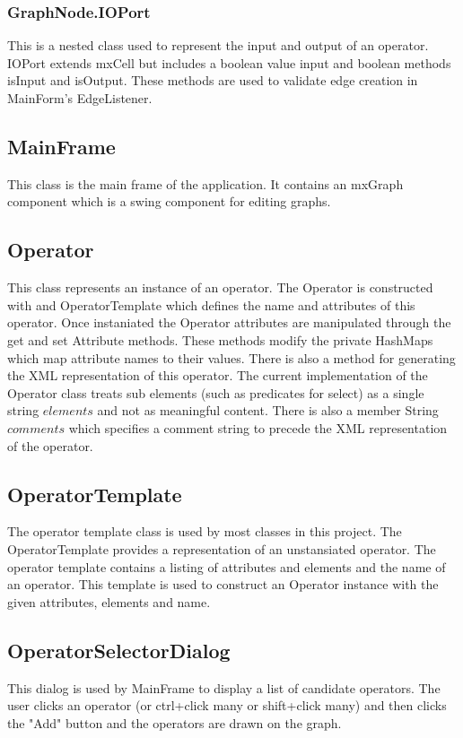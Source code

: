 \documentclass{article}
\begin{document}
\subsubsection{GraphNode.IOPort} This is a nested class used to represent the input and output of an operator.  IOPort extends mxCell but includes a boolean value input and boolean methods isInput and isOutput.  These methods are used to validate edge creation in MainForm's EdgeListener.
\subsection{MainFrame} This class is the main frame of the application.  It contains an mxGraph component which is a swing component for editing graphs.
\subsection{Operator} This class represents an instance of an operator.  The Operator is constructed with and OperatorTemplate which defines the name and attributes of this operator.  Once instaniated the Operator attributes are manipulated through the get and set Attribute methods.  These methods modify the private HashMaps which map attribute names to their values.  There is also a method for generating the XML representation of this operator.  The current implementation of the Operator class treats sub elements (such as predicates for select) as a single string $elements$ and not as meaningful content.  There is also a member String $comments$ which specifies a comment string to precede the XML representation of the operator.
\subsection{OperatorTemplate}  The operator template class is used by most classes in this project.  The OperatorTemplate provides a representation of an unstansiated operator.  The operator template contains a listing of attributes and elements and the name of an operator.  This template is used to construct an Operator instance with the given attributes, elements and name.
\subsection{OperatorSelectorDialog} This dialog is used by MainFrame to display a list of candidate operators.  The user clicks an operator (or ctrl+click many or shift+click many) and then clicks the "Add" button and the operators are drawn on the graph.
\end{document}

